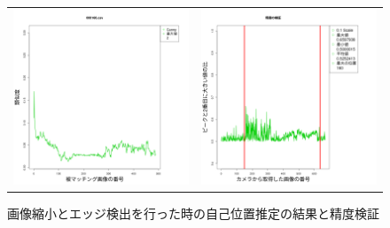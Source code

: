 \documentclass[titlepage,dvipdfmx]{jsarticle}
\begin{document}
\begin{figure}[H]
  \centering
  \begin{tabular}{cc}
    \begin{minipage}[b]{0.5\linewidth}
      \centering
      \includegraphics[pagebox=cropbox, scale=0.25]{sotuken_png/resultSCanny_000160.png}
    \end{minipage}
    &
    \begin{minipage}[b]{0.5\linewidth}
      \centering
      \includegraphics[pagebox=cropbox, scale=0.25]{sotuken_png/peak/peak_Canny_small.png}
    \end{minipage}
  \end{tabular}
  \caption{画像縮小とエッジ検出を行った時の自己位置推定の結果と精度検証}
  \label{SCannyR}
\end{figure}
\end{document}
